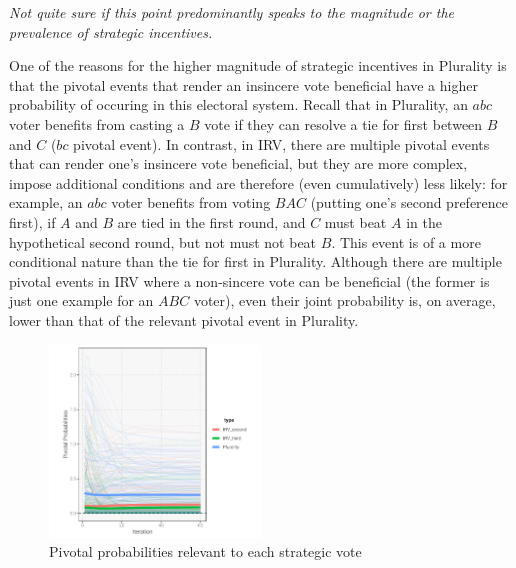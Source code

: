 \documentclass[11pt, letter]{article}
\begin{document}
\emph{Not quite sure if this point predominantly speaks to the magnitude or the prevalence of strategic incentives.}

One of the reasons for the higher magnitude of strategic incentives in Plurality is that the pivotal events that render an insincere vote beneficial have a higher probability of occuring in this electoral system. Recall that in Plurality, an $abc$ voter benefits from casting a $B$ vote if they can resolve a tie for first between $B$ and $C$ ($bc$ pivotal event). In contrast, in IRV, there are multiple pivotal events that can render one's insincere vote beneficial, but they are more complex, impose additional conditions and are therefore (even cumulatively) less likely: for example, an $abc$ voter benefits from voting $BAC$ (putting one's second preference first), if $A$ and $B$ are tied in the first round, and $C$ must beat $A$ in the hypothetical second round, but not must not beat $B$. This event is of a more conditional nature than the tie for first in Plurality. Although there are multiple pivotal events in IRV where a non-sincere vote can be beneficial (the former is just one example for an $ABC$ voter), even their joint probability is, on average, lower than that of the relevant pivotal event in Plurality.

\begin{figure}[!htb]
	\centering
	\includegraphics[width = 0.5\textwidth]{../output/figures/conj1}
	\caption{Pivotal probabilities relevant to each strategic vote}
	\label{fig:pivot}
\end{figure}
\end{document}

